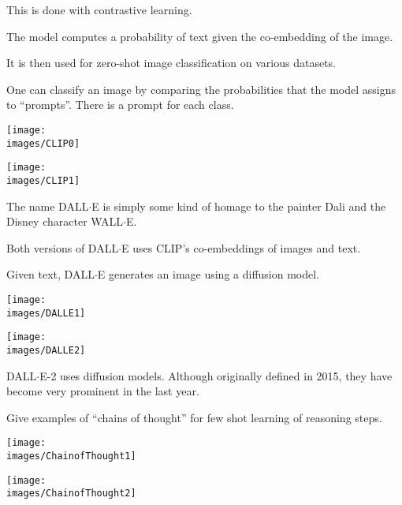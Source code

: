 {{\vfill
This is done with contrastive learning.


The model computes a probability of text given the co-embedding of the image.

\vfill
It is then used for zero-shot image classification on various datasets.

\vfill
One can classify an image by comparing the probabilities that the model assigns to ``prompts''.  There is a prompt for each class.


\centerline{\texttt{[image: \\images/CLIP0]}}


\centerline{\texttt{[image: \\images/CLIP1]}}



The name DALL$\cdot$E is simply some kind of homage to the painter Dali and the Disney character WALL$\cdot$E.

\vfill
Both versions of DALL$\cdot$E uses CLIP's co-embeddings of images and text.

\vfill
Given text, DALL$\cdot$E generates an image using a {\color{red} diffusion model}.


\centerline{\texttt{[image: \\images/DALLE1]}}


\centerline{\texttt{[image: \\images/DALLE2]}}


DALL$\cdot$E-2 uses diffusion models.  Although originally defined in 2015, they have become very prominent in the last year.


Give examples of {\color{red} ``chains of thought''} for few shot learning of reasoning steps.


\centerline{\texttt{[image: \\images/ChainofThought1]}}


\centerline{\texttt{[image: \\images/ChainofThought2]}}

}}
